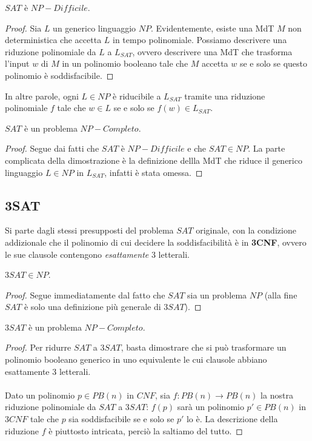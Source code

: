 \begin{lemm}
	$SAT$ è $NP-Difficile$.
\end{lemm}

\begin{proof}
	Sia $L$ un generico linguaggio $NP$. Evidentemente, esiste una MdT $M$ non deterministica che accetta $L$ in tempo polinomiale. Possiamo descrivere una riduzione polinomiale da $L$ a $L_{SAT}$, ovvero descrivere una MdT che trasforma l'input $w$ di $M$ in un polinomio booleano tale che $M$ accetta $w$ se e solo se questo polinomio è soddisfacibile.
\end{proof}

In altre parole, ogni $L \in NP$ è riducibile a $L_{SAT}$ tramite una riduzione polinomiale $f$ tale che $w \in L$ se e solo se $f(w) \in L_{SAT}$.

\begin{lemm}
	$SAT$ è un problema $NP-Completo$.
\end{lemm}

\begin{proof}
	Segue dai fatti che $SAT$ è $NP-Difficile$ e che $SAT \in NP$. La parte complicata della dimostrazione è la definizione dellla MdT che riduce il generico linguaggio $L \in NP$ in $L_{SAT}$, infatti è stata omessa.
\end{proof}

\subsection{3SAT}

Si parte dagli stessi presupposti del problema $SAT$ originale, con la condizione addizionale che il polinomio di cui decidere la soddisfacibilità è in \textbf{3CNF}, ovvero le sue clausole contengono \textit{esattamente} 3 letterali.

\begin{lemm}
  $3SAT \in NP$.
\end{lemm}

\begin{proof}
	Segue immediatamente dal fatto che $SAT$ sia un problema $NP$ (alla fine $SAT$ è solo una definizione più generale di $3SAT$).
\end{proof}

\begin{lemm}
	$3SAT$ è un problema $NP-Completo$.
\end{lemm}

\begin{proof}
	Per ridurre $SAT$ a $3SAT$, basta dimostrare che si può trasformare un polinomio booleano generico in uno equivalente le cui clausole abbiano esattamente 3 letterali. \\ \\
	Dato un polinomio $p \in PB(n)$ in $CNF$, sia $f : PB(n) \rightarrow PB(n)$ la nostra riduzione polinomiale da $SAT$ a $3SAT$: $f(p)$ sarà un polinomio $p' \in PB(n)$ in $3CNF$ tale che $p$ sia soddisfacibile se e solo se $p'$ lo è.  La descrizione della riduzione $f$ è piuttosto intricata, perciò la saltiamo del tutto.
\end{proof}

